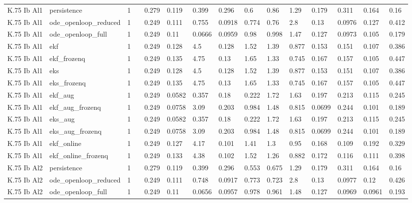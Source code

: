 \begin{table}[t]
\begin{tabular}{lllllllllllllll}
K.75 Ib Al1 & persistence & 1 &  & 0.279 & 0.119 & 0.399 & 0.296 & 0.6 & 0.86 & 1.29 & 0.179 & 0.311 & 0.164 & 0.16 \\
K.75 Ib Al1 & ode\_openloop\_reduced & 1 &  & 0.249 & 0.111 & 0.755 & 0.0918 & 0.774 & 0.76 & 2.8 & 0.13 & 0.0976 & 0.127 & 0.412 \\
K.75 Ib Al1 & ode\_openloop\_full & 1 &  & 0.249 & 0.11 & 0.0666 & 0.0959 & 0.98 & 0.998 & 1.47 & 0.127 & 0.0973 & 0.105 & 0.179 \\
K.75 Ib Al1 & ekf & 1 &  & 0.249 & 0.128 & 4.5 & 0.128 & 1.52 & 1.39 & 0.877 & 0.153 & 0.151 & 0.107 & 0.386 \\
K.75 Ib Al1 & ekf\_frozenq & 1 &  & 0.249 & 0.135 & 4.75 & 0.13 & 1.65 & 1.33 & 0.745 & 0.167 & 0.157 & 0.105 & 0.447 \\
K.75 Ib Al1 & eks & 1 &  & 0.249 & 0.128 & 4.5 & 0.128 & 1.52 & 1.39 & 0.877 & 0.153 & 0.151 & 0.107 & 0.386 \\
K.75 Ib Al1 & eks\_frozenq & 1 &  & 0.249 & 0.135 & 4.75 & 0.13 & 1.65 & 1.33 & 0.745 & 0.167 & 0.157 & 0.105 & 0.447 \\
K.75 Ib Al1 & ekf\_aug & 1 &  & 0.249 & 0.0582 & 0.357 & 0.18 & 0.222 & 1.72 & 1.63 & 0.197 & 0.213 & 0.115 & 0.245 \\
K.75 Ib Al1 & ekf\_aug\_frozenq & 1 &  & 0.249 & 0.0758 & 3.09 & 0.203 & 0.984 & 1.48 & 0.815 & 0.0699 & 0.244 & 0.101 & 0.189 \\
K.75 Ib Al1 & eks\_aug & 1 &  & 0.249 & 0.0582 & 0.357 & 0.18 & 0.222 & 1.72 & 1.63 & 0.197 & 0.213 & 0.115 & 0.245 \\
K.75 Ib Al1 & eks\_aug\_frozenq & 1 &  & 0.249 & 0.0758 & 3.09 & 0.203 & 0.984 & 1.48 & 0.815 & 0.0699 & 0.244 & 0.101 & 0.189 \\
K.75 Ib Al1 & ekf\_online & 1 &  & 0.249 & 0.127 & 4.17 & 0.101 & 1.41 & 1.3 & 0.95 & 0.168 & 0.109 & 0.192 & 0.329 \\
K.75 Ib Al1 & ekf\_online\_frozenq & 1 &  & 0.249 & 0.133 & 4.38 & 0.102 & 1.52 & 1.26 & 0.882 & 0.172 & 0.116 & 0.111 & 0.398 \\
K.75 Ib Al2 & persistence & 1 &  & 0.279 & 0.119 & 0.399 & 0.296 & 0.553 & 0.675 & 1.29 & 0.179 & 0.311 & 0.164 & 0.16 \\
K.75 Ib Al2 & ode\_openloop\_reduced & 1 &  & 0.249 & 0.111 & 0.748 & 0.0917 & 0.773 & 0.723 & 2.8 & 0.13 & 0.0977 & 0.12 & 0.426 \\
K.75 Ib Al2 & ode\_openloop\_full & 1 &  & 0.249 & 0.11 & 0.0656 & 0.0957 & 0.978 & 0.961 & 1.48 & 0.127 & 0.0969 & 0.0961 & 0.193 \\

\end{tabular}
\end{table}

